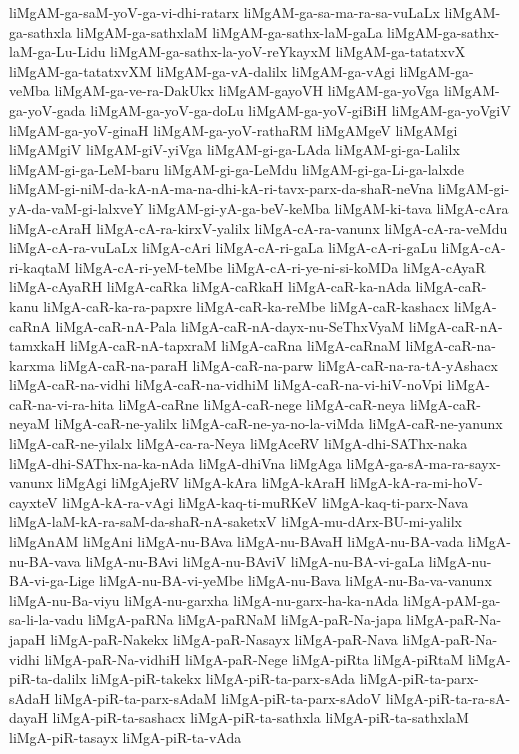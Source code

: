 {liMgAM-ga-saM-yoV-ga-vi-dhi-ratarx
liMgAM-ga-sa-ma-ra-sa-vuLaLx
liMgAM-ga-sathxla
liMgAM-ga-sathxlaM
liMgAM-ga-sathx-laM-gaLa
liMgAM-ga-sathx-laM-ga-Lu-Lidu
liMgAM-ga-sathx-la-yoV-reYkayxM
liMgAM-ga-tatatxvX
liMgAM-ga-tatatxvXM
liMgAM-ga-vA-dalilx
liMgAM-ga-vAgi
liMgAM-ga-veMba
liMgAM-ga-ve-ra-DakUkx
liMgAM-gayoVH
liMgAM-ga-yoVga
liMgAM-ga-yoV-gada
liMgAM-ga-yoV-ga-doLu
liMgAM-ga-yoV-giBiH
liMgAM-ga-yoVgiV
liMgAM-ga-yoV-ginaH
liMgAM-ga-yoV-rathaRM
liMgAMgeV
liMgAMgi
liMgAMgiV
liMgAM-giV-yiVga
liMgAM-gi-ga-LAda
liMgAM-gi-ga-Lalilx
liMgAM-gi-ga-LeM-baru
liMgAM-gi-ga-LeMdu
liMgAM-gi-ga-Li-ga-lalxde
liMgAM-gi-niM-da-kA-nA-ma-na-dhi-kA-ri-tavx-parx-da-shaR-neVna
liMgAM-gi-yA-da-vaM-gi-lalxveY
liMgAM-gi-yA-ga-beV-keMba
liMgAM-ki-tava
liMgA-cAra
liMgA-cAraH
liMgA-cA-ra-kirxV-yalilx
liMgA-cA-ra-vanunx
liMgA-cA-ra-veMdu
liMgA-cA-ra-vuLaLx
liMgA-cAri
liMgA-cA-ri-gaLa
liMgA-cA-ri-gaLu
liMgA-cA-ri-kaqtaM
liMgA-cA-ri-yeM-teMbe
liMgA-cA-ri-ye-ni-si-koMDa
liMgA-cAyaR
liMgA-cAyaRH
liMgA-caRka
liMgA-caRkaH
liMgA-caR-ka-nAda
liMgA-caR-kanu
liMgA-caR-ka-ra-papxre
liMgA-caR-ka-reMbe
liMgA-caR-kashacx
liMgA-caRnA
liMgA-caR-nA-Pala
liMgA-caR-nA-dayx-nu-SeThxVyaM
liMgA-caR-nA-tamxkaH
liMgA-caR-nA-tapxraM
liMgA-caRna
liMgA-caRnaM
liMgA-caR-na-karxma
liMgA-caR-na-paraH
liMgA-caR-na-parw
liMgA-caR-na-ra-tA-yAshacx
liMgA-caR-na-vidhi
liMgA-caR-na-vidhiM
liMgA-caR-na-vi-hiV-noVpi
liMgA-caR-na-vi-ra-hita
liMgA-caRne
liMgA-caR-nege
liMgA-caR-neya
liMgA-caR-neyaM
liMgA-caR-ne-yalilx
liMgA-caR-ne-ya-no-la-viMda
liMgA-caR-ne-yanunx
liMgA-caR-ne-yilalx
liMgA-ca-ra-Neya
liMgAceRV
liMgA-dhi-SAThx-naka
liMgA-dhi-SAThx-na-ka-nAda
liMgA-dhiVna
liMgAga
liMgA-ga-sA-ma-ra-sayx-vanunx
liMgAgi
liMgAjeRV
liMgA-kAra
liMgA-kAraH
liMgA-kA-ra-mi-hoV-cayxteV
liMgA-kA-ra-vAgi
liMgA-kaq-ti-muRKeV
liMgA-kaq-ti-parx-Nava
liMgA-laM-kA-ra-saM-da-shaR-nA-saketxV
liMgA-mu-dArx-BU-mi-yalilx
liMgAnAM
liMgAni
liMgA-nu-BAva
liMgA-nu-BAvaH
liMgA-nu-BA-vada
liMgA-nu-BA-vava
liMgA-nu-BAvi
liMgA-nu-BAviV
liMgA-nu-BA-vi-gaLa
liMgA-nu-BA-vi-ga-Lige
liMgA-nu-BA-vi-yeMbe
liMgA-nu-Bava
liMgA-nu-Ba-va-vanunx
liMgA-nu-Ba-viyu
liMgA-nu-garxha
liMgA-nu-garx-ha-ka-nAda
liMgA-pAM-ga-sa-li-la-vadu
liMgA-paRNa
liMgA-paRNaM
liMgA-paR-Na-japa
liMgA-paR-Na-japaH
liMgA-paR-Nakekx
liMgA-paR-Nasayx
liMgA-paR-Nava
liMgA-paR-Na-vidhi
liMgA-paR-Na-vidhiH
liMgA-paR-Nege
liMgA-piRta
liMgA-piRtaM
liMgA-piR-ta-dalilx
liMgA-piR-takekx
liMgA-piR-ta-parx-sAda
liMgA-piR-ta-parx-sAdaH
liMgA-piR-ta-parx-sAdaM
liMgA-piR-ta-parx-sAdoV
liMgA-piR-ta-ra-sA-dayaH
liMgA-piR-ta-sashacx
liMgA-piR-ta-sathxla
liMgA-piR-ta-sathxlaM
liMgA-piR-tasayx
liMgA-piR-ta-vAda
}
